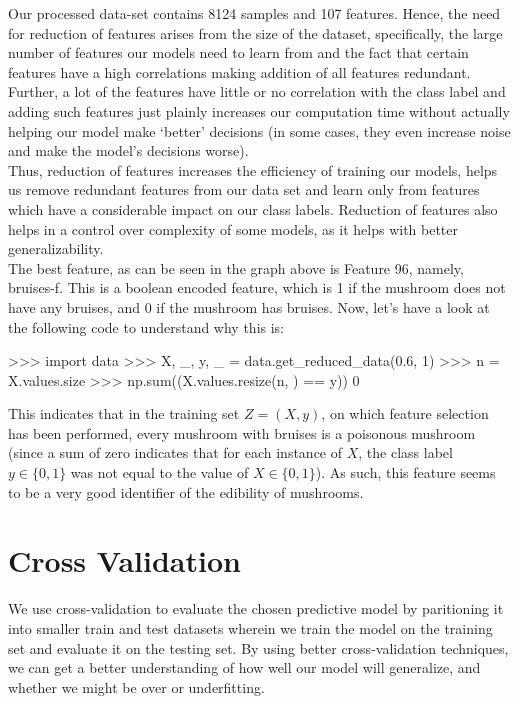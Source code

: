 \documentclass[fleqn]{article}
\begin{document}
    Our processed data-set contains 8124 samples and 107 features. Hence, the need for
    reduction of features arises from the size of the dataset, specifically, the large
    number of features our models need to learn from and the fact that certain features
    have a high correlations making addition of all features redundant. Further, a lot of
    the features have little or no correlation with the class label and
    adding such features just plainly increases our computation time without actually
    helping our model make ‘better’ decisions (in some cases, they even increase noise and
    make the model's decisions worse).\\

    Thus, reduction of features increases the efficiency
    of training our models, helps us remove redundant features from our data set and
    learn only from features which have a considerable impact on our class labels.
    Reduction of features also helps in a control over complexity of some models, as it
    helps with better generalizability.\\

    The best feature, as can be seen in the graph above is Feature 96, namely,
    bruises-f. This is a boolean encoded feature, which is 1 if the mushroom does not have
    any bruises, and 0 if the mushroom has bruises. Now, let's have a look at the following
    code to understand why this is:
    \begin{python}
    >>> import data
    >>> X, _, y, _ = data.get_reduced_data(0.6, 1)
    >>> n = X.values.size
    >>>  np.sum((X.values.resize(n, ) == y))
    0
    \end{python}
    This indicates that in the training set $ Z = (X, y) $, on which feature selection has
    been performed, every mushroom with bruises is a poisonous mushroom (since a sum of
    zero indicates that for each instance of $ X $, the class label $ y\in\{0, 1\} $ was
    not equal to the value of $ X\in\{0, 1\} $). As such, this feature seems to be a very
    good identifier of the edibility of mushrooms.

    \section{Cross Validation}
    We use cross-validation to evaluate the chosen predictive model by paritioning it into
    smaller train and test datasets wherein we train the model on the training set and
    evaluate it on the testing set. By using better cross-validation techniques, we can
    get a better understanding of how well our model will generalize, and whether we might
    be over or underfitting.\\
\end{document}
